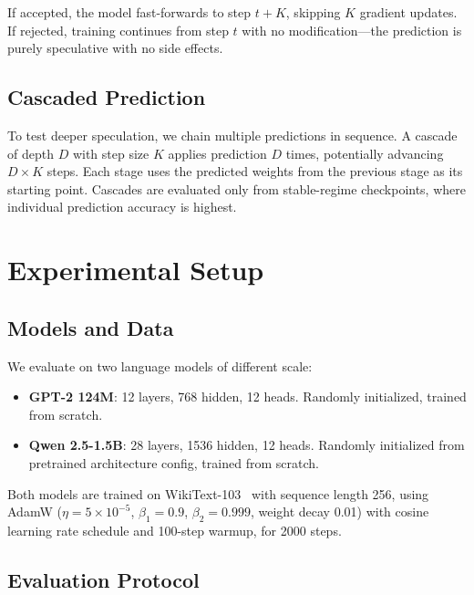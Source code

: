 \documentclass{article}
\begin{document}
If accepted, the model fast-forwards to step $t+K$, skipping $K$ gradient updates.
If rejected, training continues from step $t$ with no modification---the prediction is purely speculative with no side effects.

\subsection{Cascaded Prediction}
\label{sec:cascade}

To test deeper speculation, we chain multiple predictions in sequence.
A cascade of depth $D$ with step size $K$ applies prediction $D$ times, potentially advancing $D \times K$ steps.
Each stage uses the predicted weights from the previous stage as its starting point.
Cascades are evaluated only from stable-regime checkpoints, where individual prediction accuracy is highest.

\section{Experimental Setup}
\label{sec:experiments}

\subsection{Models and Data}

We evaluate on two language models of different scale:
\begin{itemize}
    \item \textbf{GPT-2 124M}: 12 layers, 768 hidden, 12 heads. Randomly initialized, trained from scratch.
    \item \textbf{Qwen 2.5-1.5B}: 28 layers, 1536 hidden, 12 heads. Randomly initialized from pretrained architecture config, trained from scratch.
\end{itemize}
Both models are trained on WikiText-103~\citep{merity2017pointer} with sequence length 256, using AdamW ($\eta = 5 \times 10^{-5}$, $\beta_1 = 0.9$, $\beta_2 = 0.999$, weight decay 0.01) with cosine learning rate schedule and 100-step warmup, for 2000 steps.

\subsection{Evaluation Protocol}
\end{document}
